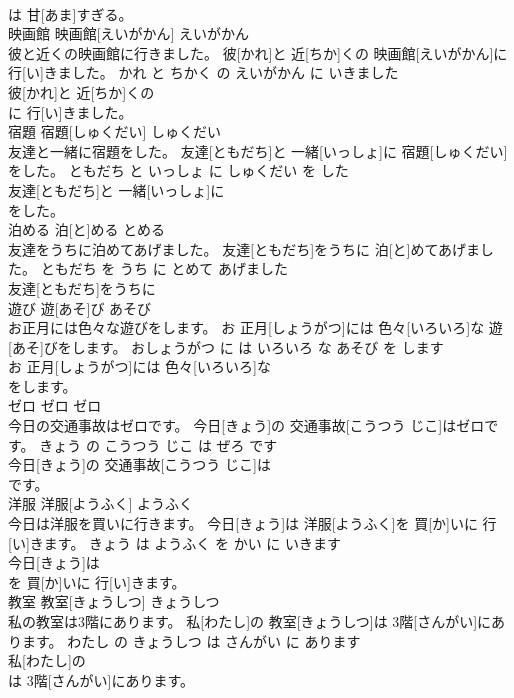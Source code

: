 \documentclass[8pt]{extreport}
\begin{document}
\begin{CJK}{UTF8}{min}
\\	は 甘[あま]すぎる。		
\\	映画館	映画館[えいがかん]	えいがかん	
\\	彼と近くの映画館に行きました。	彼[かれ]と 近[ちか]くの 映画館[えいがかん]に 行[い]きました。	かれ と ちかく の えいがかん に いきました	
\\	彼[かれ]と 近[ちか]くの
\\	に 行[い]きました。		
\\	宿題	宿題[しゅくだい]	しゅくだい	
\\	友達と一緒に宿題をした。	友達[ともだち]と 一緒[いっしょ]に 宿題[しゅくだい]をした。	ともだち と いっしょ に しゅくだい を した	
\\	友達[ともだち]と 一緒[いっしょ]に
\\	をした。		
\\	泊める	泊[と]める	とめる	
\\	友達をうちに泊めてあげました。	友達[ともだち]をうちに 泊[と]めてあげました。	ともだち を うち に とめて あげました	
\\	友達[ともだち]をうちに
\\	遊び	遊[あそ]び	あそび	
\\	お正月には色々な遊びをします。	お 正月[しょうがつ]には 色々[いろいろ]な 遊[あそ]びをします。	おしょうがつ に は いろいろ な あそび を します	
\\	お 正月[しょうがつ]には 色々[いろいろ]な
\\	をします。		
\\	ゼロ	ゼロ	ゼロ	
\\	今日の交通事故はゼロです。	今日[きょう]の 交通事故[こうつう じこ]はゼロです。	きょう の こうつう じこ は ぜろ です	
\\	今日[きょう]の 交通事故[こうつう じこ]は
\\	です。		
\\	洋服	洋服[ようふく]	ようふく	
\\	今日は洋服を買いに行きます。	今日[きょう]は 洋服[ようふく]を 買[か]いに 行[い]きます。	きょう は ようふく を かい に いきます	
\\	今日[きょう]は
\\	を 買[か]いに 行[い]きます。		
\\	教室	教室[きょうしつ]	きょうしつ	
\\	私の教室は3階にあります。	私[わたし]の 教室[きょうしつ]は 3階[さんがい]にあります。	わたし の きょうしつ は さんがい に あります	
\\	私[わたし]の
\\	は 3階[さんがい]にあります。		

\end{CJK}
\end{document}
